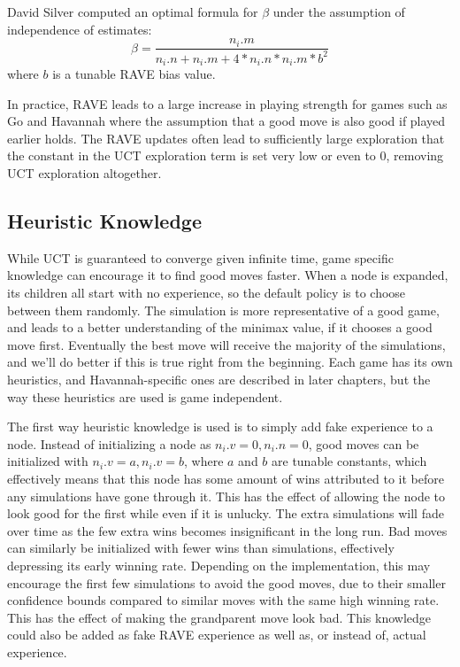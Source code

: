 David Silver computed an optimal formula for $\beta$ under the assumption of independence of estimates:
\begin{equation}\label{eqn:rave4} \beta = \frac{n_i.m}{n_i.n+n_i.m+4*n_i.n*n_i.m*b^2} \end{equation}
where $b$ is a tunable RAVE bias value.

In practice, RAVE leads to a large increase in playing strength for games such as Go and Havannah where the assumption that a good move is also good if played earlier holds. The RAVE updates often lead to sufficiently large exploration that the constant in the UCT exploration term is set very low or even to 0, removing UCT exploration altogether.

\subsection{Heuristic Knowledge}\label{sec:heuristicknowledge}

While UCT is guaranteed to converge given infinite time, game specific knowledge can encourage it to find good moves faster. When a node is expanded, its children all start with no experience, so the default policy is to choose between them randomly. The simulation is more representative of a good game, and leads to a better understanding of the minimax value, if it chooses a good move first. Eventually the best move will receive the majority of the simulations, and we'll do better if this is true right from the beginning. Each game has its own heuristics, and Havannah-specific ones are described in later chapters, but the way these heuristics are used is game independent.

The first way heuristic knowledge is used is to simply add fake experience to a node. Instead of initializing a node as $n_i.v = 0, n_i.n = 0$, good moves can be initialized with $n_i.v = a, n_i.v = b$, where $a$ and $b$ are tunable constants, which effectively means that this node has some amount of wins attributed to it before any simulations have gone through it. This has the effect of allowing the node to look good for the first while even if it is unlucky. The extra simulations will fade over time as the few extra wins becomes insignificant in the long run. Bad moves can similarly be initialized with fewer wins than simulations, effectively depressing its early winning rate. Depending on the implementation, this may encourage the first few simulations to avoid the good moves, due to their smaller confidence bounds compared to similar moves with the same high winning rate. This has the effect of making the grandparent move look bad. This knowledge could also be added as fake RAVE experience as well as, or instead of, actual experience.

